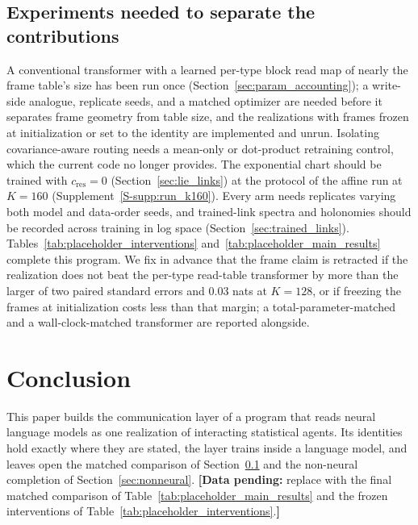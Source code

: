 \documentclass[twoside,11pt]{article}
\providecommand{\datapending}[1]{{\color{red!60!black}\textbf{[Data pending:} #1\textbf{]}}}
\begin{document}
\subsection{Experiments needed to separate the contributions}
\label{sec:needed_experiments}

A conventional transformer with a learned per-type block read map of nearly the frame table's size has been run once (Section~\ref{sec:param_accounting}); a write-side analogue, replicate seeds, and a matched optimizer are needed before it separates frame geometry from table size, and the realizations with frames frozen at initialization or set to the identity are implemented and unrun. Isolating covariance-aware routing needs a mean-only or dot-product retraining control, which the current code no longer provides. The exponential chart should be trained with $c_{\mathrm{res}}=0$ (Section~\ref{sec:lie_links}) at the protocol of the affine run at $K=160$ (Supplement~\ref{S-supp:run_k160}). Every arm needs replicates varying both model and data-order seeds, and trained-link spectra and holonomies should be recorded across training in log space (Section~\ref{sec:trained_links}). Tables~\ref{tab:placeholder_interventions} and~\ref{tab:placeholder_main_results} complete this program. We fix in advance that the frame claim is retracted if the realization does not beat the per-type read-table transformer by more than the larger of two paired standard errors and $0.03$ nats at $K=128$, or if freezing the frames at initialization costs less than that margin; a total-parameter-matched and a wall-clock-matched transformer are reported alongside.

\section{Conclusion}
\label{sec:conclusion}

This paper builds the communication layer of a program that reads neural language models as one realization of interacting statistical agents. Its identities hold exactly where they are stated, the layer trains inside a language model, and leaves open the matched comparison of Section~\ref{sec:needed_experiments} and the non-neural completion of Section~\ref{sec:nonneural}.
\datapending{replace with the final matched comparison of Table~\ref{tab:placeholder_main_results} and the frozen interventions of Table~\ref{tab:placeholder_interventions}.} %
\end{document}
